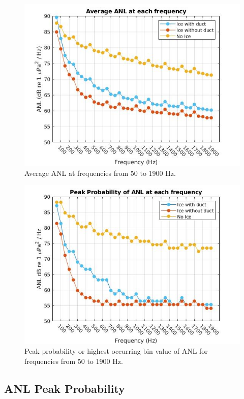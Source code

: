 \begin{figure}[p]
\centering
\includegraphics[scale=0.6]{Figures/Average_ANL.jpg}
\caption{Average ANL at frequencies from 50 to 1900 Hz.}
\label{fig_avg_anl}
\end{figure}

\begin{figure}[p]
\centering
\includegraphics[scale=0.6]{Figures/peak_prob_ANL.jpg}
\caption{Peak probability or highest occurring bin value of ANL for frequencies from 50 to 1900 Hz.}
\label{fig_peak_prob}
\end{figure}

\subsection{ANL Peak Probability}

